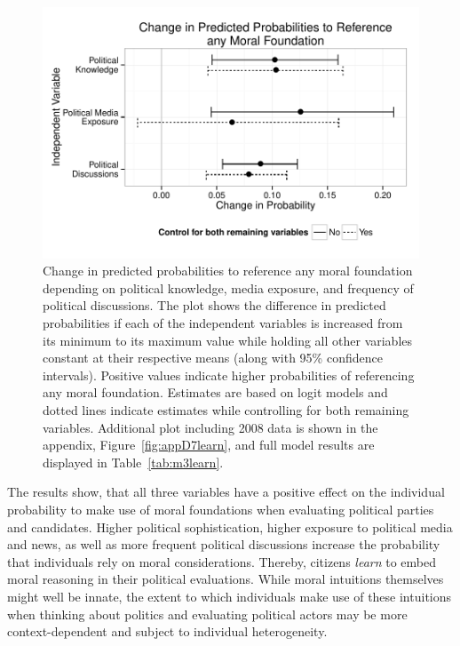 \documentclass[12pt]{article}
\begin{document}
\begin{figure}[h]\centering
\includegraphics[scale=.9]{../calc/fig/fig3learn.pdf}
\caption{Change in predicted probabilities to reference any moral foundation depending on political knowledge, media exposure, and frequency of political discussions. The plot shows the difference in predicted probabilities if each of the independent variables is increased from its minimum to its maximum value while holding all other variables constant at their respective means (along with 95\% confidence intervals). Positive values indicate higher probabilities of referencing any moral foundation. Estimates are based on logit models and dotted lines indicate estimates while controlling for both remaining variables. Additional plot including 2008 data is shown in the appendix, Figure~\ref{fig:appD7learn}, and full model results are displayed in Table~\ref{tab:m3learn}.}\label{fig:3learn}
\end{figure}

The results show, that all three variables have a positive effect on the individual probability to make use of moral foundations when evaluating political parties and candidates. Higher political sophistication, higher exposure to political media and news, as well as more frequent political discussions increase the probability that individuals rely on moral considerations. Thereby, citizens \textit{learn} to embed moral reasoning in their political evaluations. While moral intuitions themselves might well be innate, the extent to which individuals make use of these intuitions when thinking about politics and evaluating political actors may be more context-dependent and subject to individual heterogeneity.
\end{document}
